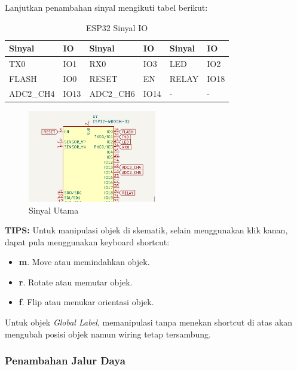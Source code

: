 \documentclass[12pt]{book}
\begin{document}
	\newpage
	Lanjutkan penambahan sinyal mengikuti tabel berikut:

	\begin{table}[h!]
		\begin{center}
			\begin{tabular}{|l|l|l|l|l|l|}
				\toprule
				Sinyal & IO & Sinyal & IO & Sinyal & IO \\
				\midrule
				TX0 & IO1 & RX0 & IO3 & LED & IO2 \\
				FLASH & IO0 & RESET & EN & RELAY & IO18 \\
				ADC2\_CH4 & IO13 & ADC2\_CH6 & IO14 & - & - \\
				\bottomrule
			\end{tabular}
			\caption{ESP32 Sinyal IO}
		\end{center}
	\end{table}

	\begin{figure}[!ht]
		\centering
		\includegraphics[width=0.5\textwidth]{images/sch/sch_7}
		\caption{Sinyal Utama}
	\end{figure}

	\textbf{TIPS:} Untuk manipulasi objek di skematik, selain menggunakan klik kanan, dapat pula menggunakan
	keyboard shortcut:
	\begin{itemize}
		\item \textbf{m}. Move atau memindahkan objek.

		\item \textbf{r}. Rotate atau memutar objek.

		\item \textbf{f}. Flip atau menukar orientasi objek.
	\end{itemize}

	Untuk objek \textit{Global Label}, memanipulasi tanpa menekan shortcut di atas akan mengubah posisi objek namun wiring tetap tersambung.

	\subsubsection{Penambahan Jalur Daya}
\end{document}
